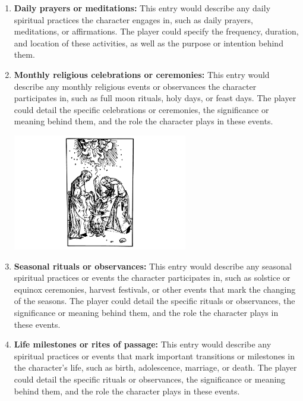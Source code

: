 \documentclass[12pt]{book}
\begin{document}
\begin{enumerate}

    \item \textbf{Daily prayers or meditations:}
    This entry would describe any daily spiritual practices the character engages in, such as daily prayers, meditations, or affirmations. The player could specify the frequency, duration, and location of these activities, as well as the purpose or intention behind them.
    
    \item \textbf{Monthly religious celebrations or ceremonies:}
    This entry would describe any monthly religious events or observances the character participates in, such as full moon rituals, holy days, or feast days. The player could detail the specific celebrations or ceremonies, the significance or meaning behind them, and the role the character plays in these events.

    \begin{center}
        \includegraphics[width=0.6\textwidth]{./images/religion07.pdf}
    \end{center}
    
    \item \textbf{Seasonal rituals or observances:}
    This entry would describe any seasonal spiritual practices or events the character participates in, such as solstice or equinox ceremonies, harvest festivals, or other events that mark the changing of the seasons. The player could detail the specific rituals or observances, the significance or meaning behind them, and the role the character plays in these events.
    
    \item \textbf{Life milestones or rites of passage:}
    This entry would describe any spiritual practices or events that mark important transitions or milestones in the character's life, such as birth, adolescence, marriage, or death. The player could detail the specific rituals or observances, the significance or meaning behind them, and the role the character plays in these events.


\end{enumerate}
\end{document}
